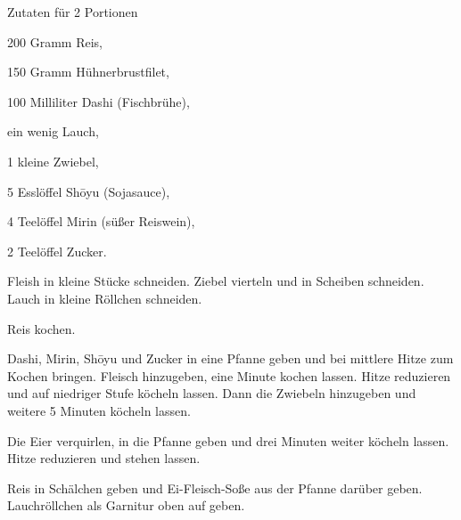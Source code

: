 \startsection[title={Oyakodon},reference=oyakodon]

\startitemize
\item Zutaten für 2 Portionen
      \startitemize
      \item 200 Gramm Reis,
      \item 150 Gramm Hühnerbrustfilet,
      \item 100 Milliliter Dashi (Fischbrühe),
      \item ein wenig Lauch,
      \item 1 kleine Zwiebel,
      \item 5 Esslöffel Shōyu (Sojasauce),
      \item 4 Teelöffel Mirin (süßer Reiswein),
      \item 2 Teelöffel Zucker.
      \stopitemize

\item Fleish in kleine Stücke schneiden. Ziebel vierteln und in
  Scheiben schneiden. Lauch in kleine Röllchen schneiden.
\item Reis kochen.
\item Dashi, Mirin, Shōyu und Zucker in eine Pfanne geben und bei
  mittlere Hitze zum Kochen bringen. Fleisch hinzugeben, eine Minute
  kochen lassen. Hitze reduzieren und auf niedriger Stufe köcheln
  lassen. Dann die Zwiebeln hinzugeben und weitere 5 Minuten köcheln
  lassen.
\item Die Eier verquirlen, in die Pfanne geben und drei Minuten weiter
  köcheln lassen. Hitze reduzieren und stehen lassen.
\item Reis in Schälchen geben und Ei-Fleisch-Soße aus der Pfanne darüber
  geben. Lauchröllchen als Garnitur oben auf geben.
\stopitemize

\stopsection
